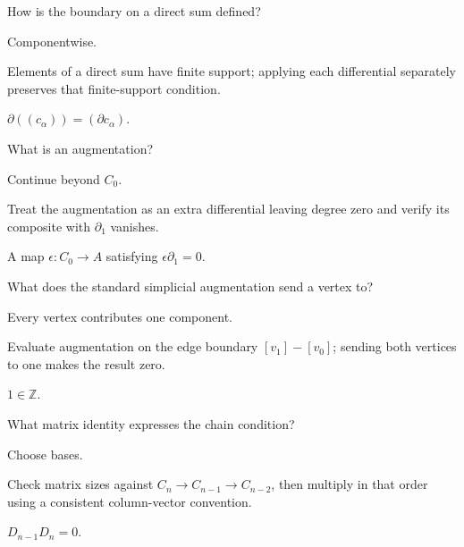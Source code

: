 \begin{exercise}\label{exr:viii16-20}
How is the boundary on a direct sum defined?
\end{exercise}
\begin{hint}
Componentwise.

Elements of a direct sum have finite support; applying each differential separately preserves that finite-support condition.
\end{hint}
\begin{solution}
\(\partial((c_\alpha))=(\partial c_\alpha)\).
\end{solution}

\begin{exercise}\label{exr:viii16-21}
What is an augmentation?
\end{exercise}
\begin{hint}
Continue beyond \(C_0\).

Treat the augmentation as an extra differential leaving degree zero and verify its composite with \(\partial_1\) vanishes.
\end{hint}
\begin{solution}
A map \(\epsilon:C_0\to A\) satisfying \(\epsilon\partial_1=0\).
\end{solution}

\begin{exercise}\label{exr:viii16-22}
What does the standard simplicial augmentation send a vertex to?
\end{exercise}
\begin{hint}
Every vertex contributes one component.

Evaluate augmentation on the edge boundary \([v_1]-[v_0]\); sending both vertices to one makes the result zero.
\end{hint}
\begin{solution}
\(1\in\mathbb Z\).
\end{solution}

\begin{exercise}\label{exr:viii16-23}
What matrix identity expresses the chain condition?
\end{exercise}
\begin{hint}
Choose bases.

Check matrix sizes against \(C_n\to C_{n-1}\to C_{n-2}\), then multiply in that order using a consistent column-vector convention.
\end{hint}
\begin{solution}
\(D_{n-1}D_n=0\).
\end{solution}

